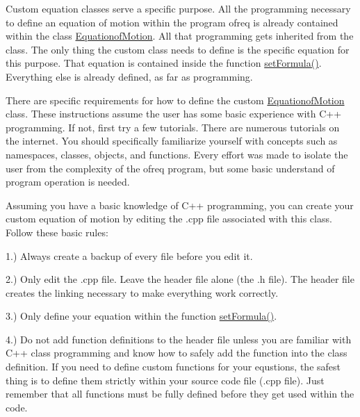 Custom equation classes serve a specific purpose. All the programming necessary to define an equation of motion within the program ofreq is already contained within the class \hyperlink{classosea_1_1ofreq_1_1_equationof_motion}{Equationof\-Motion}. All that programming gets inherited from the class. The only thing the custom class needs to define is the specific equation for this purpose. That equation is contained inside the function \hyperlink{classosea_1_1ofreq_1_1_eqn_translation_af2681a6f73df8e8518d81eba5ac9152e}{set\-Formula()}. Everything else is already defined, as far as programming.

There are specific requirements for how to define the custom \hyperlink{classosea_1_1ofreq_1_1_equationof_motion}{Equationof\-Motion} class. These instructions assume the user has some basic experience with C++ programming. If not, first try a few tutorials. There are numerous tutorials on the internet. You should specifically familiarize yourself with concepts such as namespaces, classes, objects, and functions. Every effort was made to isolate the user from the complexity of the ofreq program, but some basic understand of program operation is needed.

Assuming you have a basic knowledge of C++ programming, you can create your custom equation of motion by editing the .cpp file associated with this class. Follow these basic rules\-:

1.) Always create a backup of every file before you edit it.

2.) Only edit the .cpp file. Leave the header file alone (the .h file). The header file creates the linking necessary to make everything work correctly.

3.) Only define your equation within the function \hyperlink{classosea_1_1ofreq_1_1_eqn_translation_af2681a6f73df8e8518d81eba5ac9152e}{set\-Formula()}.

4.) Do not add function definitions to the header file unless you are familiar with C++ class programming and know how to safely add the function into the class definition. If you need to define custom functions for your equstions, the safest thing is to define them strictly within your source code file (.cpp file). Just remember that all functions must be fully defined before they get used within the code.

